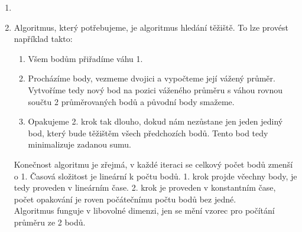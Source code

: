 \documentclass[12pt]{iv003}
\begin{document}
\begin{enumerate}
	\item 
	\item Algoritmus, který potřebujeme, je algoritmus hledání těžiště. To lze provést například takto:\\
	
	\begin{enumerate}
		\item Všem bodům přiřadíme váhu 1.
		\item Procházíme body, vezmeme dvojici a vypočteme její vážený průměr. Vytvoříme tedy nový bod na pozici váženého průměru s váhou rovnou součtu 2 průměrovaných bodů a původní body smažeme.
		\item Opakujeme 2. krok tak dlouho, dokud nám nezůstane jen jeden jediný bod, který bude těžištěm všech předchozích bodů. Tento bod tedy minimalizuje zadanou sumu.
	\end{enumerate}
	Konečnost algoritmu je zřejmá, v každé iteraci se celkový počet bodů zmenší o 1. Časová složitost je lineární k počtu bodů. 1. krok projde včechny body, je tedy proveden v lineárním čase. 2. krok je proveden v konstantním čase, počet opakování je roven počátečnímu počtu bodů bez jedné.\\
	Algoritmus funguje v libovolné dimenzi, jen se mění vzorec pro počítání průměru ze 2 bodů.
\end{enumerate}
\end{document}
